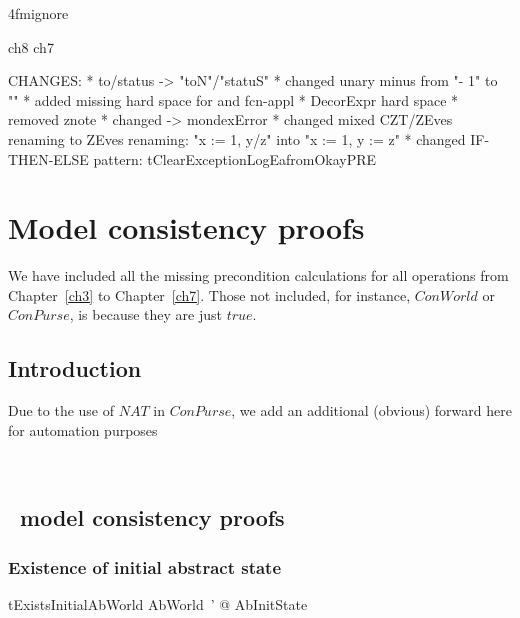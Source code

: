 \ai4fmignore{
\begin{zsection}
  \SECTION ch8 \parents ch7
\end{zsection}
CHANGES:
* to/status -> "toN"/"statuS"
* changed unary minus from "- 1" to ""
* added missing hard space for \inv and fcn-appl
* DecorExpr hard space
* removed znote
* changed \bot -> mondexError
* changed mixed CZT/ZEves renaming to ZEves renaming: "x := 1, y/z" into "x := 1, y := z"
* changed IF-THEN-ELSE pattern: tClearExceptionLogEafromOkayPRE
}

\chapter{Model consistency proofs}\label{ch8}

We have included all the missing precondition
calculations for all operations from Chapter~\ref{ch3}
to Chapter~\ref{ch7}. Those not included, for instance,
$ConWorld$ or $ConPurse$, is because they are just $true$.

\section{Introduction}

Due to the use of $NAT$ in $ConPurse$, we add
an additional (obvious) forward here for automation purposes
%
\begin{LFRT}
~\end{LFRT}

\section{\Abs\ model consistency proofs}\label{ch8.specproof-ab}

\subsection{Existence of initial abstract state}\label{ch8.specproof-ab-init}

\begin{LThm}
\begin{theorem}{tExistsInitialAbWorld}
   \exists AbWorld~' @ AbInitState
\end{theorem}~\end{LThm}

